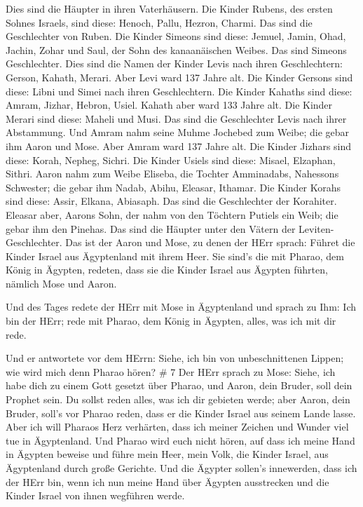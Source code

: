  Dies sind die Häupter in ihren Vaterhäusern. Die Kinder
Rubens, des ersten Sohnes Israels, sind diese: Henoch, Pallu, Hezron,
Charmi. Das sind die Geschlechter von Ruben.  Die Kinder
Simeons sind diese: Jemuel, Jamin, Ohad, Jachin, Zohar und Saul, der
Sohn des kanaanäischen Weibes. Das sind Simeons Geschlechter.
 Dies sind die Namen der Kinder Levis nach ihren
Geschlechtern: Gerson, Kahath, Merari. Aber Levi ward 137 Jahre alt.
 Die Kinder Gersons sind diese: Libni und Simei nach ihren
Geschlechtern.  Die Kinder Kahaths sind diese: Amram,
Jizhar, Hebron, Usiel. Kahath aber ward 133 Jahre alt.  Die
Kinder Merari sind diese: Maheli und Musi. Das sind die Geschlechter
Levis nach ihrer Abstammung.  Und Amram nahm seine Muhme
Jochebed zum Weibe; die gebar ihm Aaron und Mose. Aber Amram ward 137
Jahre alt.  Die Kinder Jizhars sind diese: Korah, Nepheg,
Sichri.  Die Kinder Usiels sind diese: Misael, Elzaphan,
Sithri.  Aaron nahm zum Weibe Eliseba, die Tochter
Amminadabs, Nahessons Schwester; die gebar ihm Nadab, Abihu, Eleasar,
Ithamar.  Die Kinder Korahs sind diese: Assir, Elkana,
Abiasaph. Das sind die Geschlechter der Korahiter.  Eleasar
aber, Aarons Sohn, der nahm von den Töchtern Putiels ein Weib; die gebar
ihm den Pinehas. Das sind die Häupter unter den Vätern der
Leviten-Geschlechter.  Das ist der Aaron und Mose, zu denen
der HErr sprach: Führet die Kinder Israel aus Ägyptenland mit ihrem
Heer.  Sie sind's die mit Pharao, dem König in Ägypten,
redeten, dass sie die Kinder Israel aus Ägypten führten, nämlich Mose
und Aaron.

 Und des Tages redete der HErr mit Mose in Ägyptenland
 und sprach zu Ihm: Ich bin der HErr; rede mit Pharao, dem
König in Ägypten, alles, was ich mit dir rede.

 Und er antwortete vor dem HErrn: Siehe, ich bin von
unbeschnittenen Lippen; wie wird mich denn Pharao hören? \# 7
 Der HErr sprach zu Mose: Siehe, ich habe dich zu einem Gott
gesetzt über Pharao, und Aaron, dein Bruder, soll dein Prophet sein.
 Du sollst reden alles, was ich dir gebieten werde; aber
Aaron, dein Bruder, soll's vor Pharao reden, dass er die Kinder Israel
aus seinem Lande lasse.  Aber ich will Pharaos Herz
verhärten, dass ich meiner Zeichen und Wunder viel tue in Ägyptenland.
 Und Pharao wird euch nicht hören, auf dass ich meine Hand
in Ägypten beweise und führe mein Heer, mein Volk, die Kinder Israel,
aus Ägyptenland durch große Gerichte.  Und die Ägypter
sollen's innewerden, dass ich der HErr bin, wenn ich nun meine Hand über
Ägypten ausstrecken und die Kinder Israel von ihnen wegführen werde.


